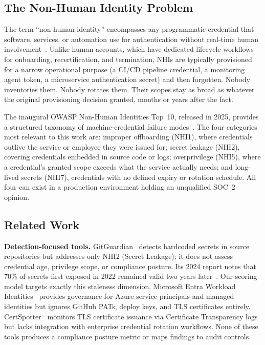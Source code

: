 \documentclass[journal]{IEEEtran}
\begin{document}
\subsection{The Non-Human Identity Problem}

The term ``non-human identity'' encompasses any programmatic credential that software, services, or automation use for authentication without real-time human involvement~\cite{hashicorp2023secrets}. Unlike human accounts, which have dedicated lifecycle workflows for onboarding, recertification, and termination, NHIs are typically provisioned for a narrow operational purpose (a CI/CD pipeline credential, a monitoring agent token, a microservice authentication secret) and then forgotten. Nobody inventories them. Nobody rotates them. Their scopes stay as broad as whatever the original provisioning decision granted, months or years after the fact.

The inaugural OWASP Non-Human Identities Top~10, released in 2025, provides a structured taxonomy of machine-credential failure modes~\cite{owaspnhi2025}. The four categories most relevant to this work are: improper offboarding (NHI1), where credentials outlive the service or employee they were issued for; secret leakage (NHI2), covering credentials embedded in source code or logs; overprivilege (NHI5), where a credential's granted scope exceeds what the service actually needs; and long-lived secrets (NHI7), credentials with no defined expiry or rotation schedule. All four can exist in a production environment holding an unqualified SOC~2 opinion.

\subsection{Related Work}

\textbf{Detection-focused tools.} GitGuardian~\cite{gitguardian2024} detects hardcoded secrets in source repositories but addresses only NHI2 (Secret Leakage); it does not assess credential age, privilege scope, or compliance posture. Its 2024 report notes that 70\% of secrets first exposed in 2022 remained valid two years later~\cite[p.\,12]{gitguardian2024}. Our scoring model targets exactly this staleness dimension. Microsoft Entra Workload Identities~\cite{entra2024} provides governance for Azure service principals and managed identities but ignores GitHub PATs, deploy keys, and TLS certificates entirely. CertSpotter~\cite{sslmate2024} monitors TLS certificate issuance via Certificate Transparency logs but lacks integration with enterprise credential rotation workflows. None of these tools produces a compliance posture metric or maps findings to audit controls.
\end{document}

